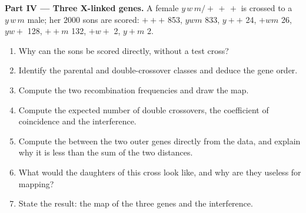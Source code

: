 \begin{problem}
\medskip
\noindent\textbf{Part IV --- Three X-linked genes.}
A female $y\,w\,m/+\,+\,+$ is crossed to a $y\,w\,m$ male; her $2000$
sons are scored: $+++$ 853, $ywm$ 833, $y++$ 24, $+wm$ 26, $yw+$ 128,
$++m$ 132, $+w+$ 2, $y+m$ 2.
\begin{enumerate}[resume]
  \item Why can the sons be scored directly, without a test cross?
  \item Identify the parental and double-crossover classes and
        deduce the gene order.
  \item Compute the two recombination frequencies and draw the map.
  \item Compute the expected number of double crossovers, the
        coefficient of coincidence and the interference.
  \item Compute the  between the two outer
        genes directly from the data, and explain why it is less than
        the sum of the two distances.
  \item What would the daughters of this cross look like, and why are
        they useless for mapping?
  \item State the result: the map of the three genes and the
        interference.
\end{enumerate}
\end{problem}
